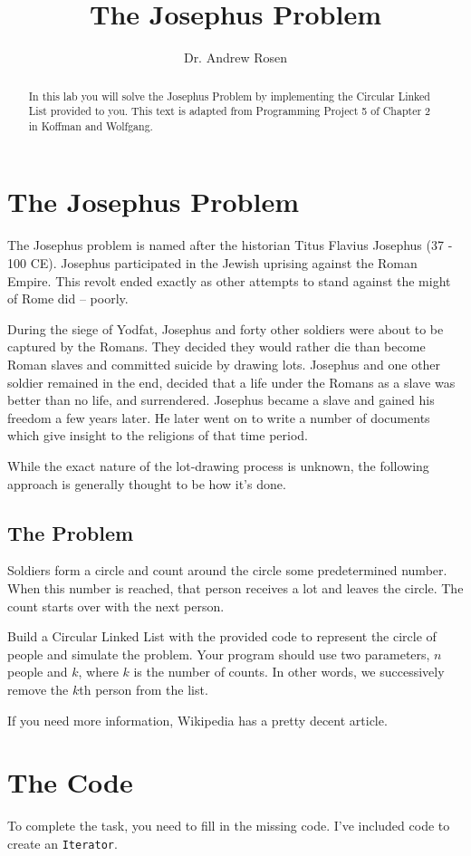 \documentclass[10pt,letterpaper]{article}
\author{Dr. Andrew Rosen}
\title{The Josephus Problem}
\date{}
\begin{document}
\maketitle

\begin{abstract}
	In this lab you will solve the Josephus Problem by implementing the Circular Linked List provided to you.  This text is adapted from Programming Project 5 of Chapter 2 in Koffman and Wolfgang. 
\end{abstract}
\section{The Josephus Problem}
The Josephus problem is named after the historian Titus Flavius Josephus (37 - 100 CE). 
Josephus participated in the Jewish uprising against the Roman Empire.  
This revolt ended exactly as other attempts to stand against the might of Rome did  --  poorly. 

During the siege of Yodfat, Josephus and forty other soldiers were about to be captured by the Romans. 
They decided they would rather die than become Roman slaves and committed suicide by drawing lots.  
Josephus and one other soldier remained in the end, decided that a life under the Romans as a slave was better than no life, and surrendered. 
Josephus became a slave and gained his freedom a few years later.
He later went on to write a number of documents which give insight to the religions of that time period.

While the exact nature of the lot-drawing process is unknown, the following approach is generally thought to be how it's done.

\subsection{The Problem}
Soldiers form a circle and count around the circle some predetermined number.  
When this number is reached, that person receives a lot and leaves the circle.
The count starts over with the next person.

Build a Circular Linked List with the provided code to represent the circle of people and simulate the problem.
Your program should use two parameters, $n$ people and $k$, where $k$ is the number of counts. In other words, we successively remove the $k$th person from the list.

If you need more information, Wikipedia has a pretty decent article.


\section{The Code}
To complete the task, you need to fill in the missing code.
I've included code to create an \texttt{Iterator}.
\end{document}
